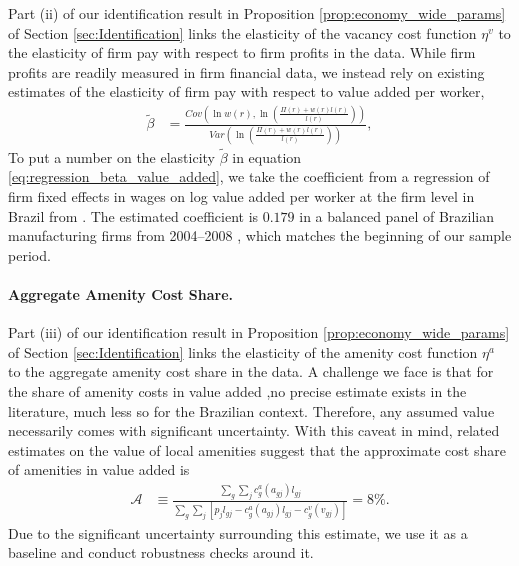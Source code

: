 Part (ii) of our identification result in Proposition \ref{prop:economy_wide_params} of Section \ref{sec:Identification} links the elasticity of the vacancy cost function $\eta^{v}$ to the elasticity of firm pay with respect to firm profits in the data. While firm profits are readily measured in firm financial data, we instead rely on existing estimates of the elasticity of firm pay with respect to value added per worker,
%
\begin{align}
    \tilde{\beta} &= \frac{Cov( \ln w(r), \ln \left( \frac{\Pi(r) + w(r)l(r)}{l(r)} \right) )}{Var( \ln \left( \frac{\Pi(r) + w(r)l(r)}{l(r)} \right) )}, \label{eq:regression_beta_value_added}
\end{align}
%
To put a number on the elasticity $\tilde{\beta}$ in equation \eqref{eq:regression_beta_value_added}, we take the coefficient from a regression of firm fixed effects in wages on log value added per worker at the firm level in Brazil from \citet{AlvarezBenguriaEngbomMoser2018}. The estimated coefficient is $0.179$ in a balanced panel of Brazilian manufacturing firms from 2004--2008 \citep[see Table E1 of][]{AlvarezBenguriaEngbomMoser2018}, which matches the beginning of our sample period.


\paragraph{Aggregate Amenity Cost Share.}

Part (iii) of our identification result in Proposition \ref{prop:economy_wide_params} of Section \ref{sec:Identification} links the elasticity of the amenity cost function $\eta^{a}$ to the aggregate amenity cost share in the data. A challenge we face is that for the share of amenity costs in value added ,no precise estimate exists in the literature, much less so for the Brazilian context. Therefore, any assumed value necessarily comes with significant uncertainty. With this caveat in mind, related estimates on the value of local amenities \citep{BieriKuminoffPope2023} suggest that the approximate cost share of amenities in value added is
%
\begin{align}
    \mathcal{A} &\equiv \frac{ \sum_{g}\sum_{j}c_{g}^{a}(a_{gj})l_{gj} }{ \sum_{g}\sum_{j} \left[ p_{j}l_{gj} - c_{g}^{a}(a_{gj})l_{gj} - c_{g}^{v}(v_{gj}) \right] } = 8\%. \label{eq:amenities_share_app}
\end{align}
%
Due to the significant uncertainty surrounding this estimate, we use it as a baseline and conduct robustness checks around it.


